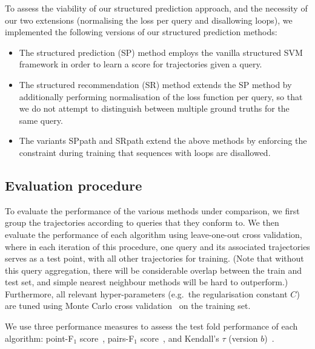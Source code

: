 To assess the viability of our structured prediction approach, and the necessity of our two extensions (normalising the loss per query and disallowing loops), we implemented the following versions of our structured prediction methods:
\begin{itemize}[leftmargin=0.125in]
	\item The structured prediction ({\sc SP}) method employs the vanilla structured SVM framework in order to learn a score for trajectories given a query.

	\item The structured recommendation ({\sc SR}) method extends the {\sc SP} method by additionally performing normalisation of the loss function per query,
	so that we do not attempt to distinguish between multiple ground truths for the same query.

	\item The variants {\sc SPpath} and {\sc SRpath} extend the above methods by enforcing the constraint during training that sequences with loops are disallowed.
\end{itemize}


%
\subsection{Evaluation procedure}

To evaluate the performance of the various methods under comparison,
we first group the trajectories according to queries that they conform to.
We then evaluate the performance of each algorithm using leave-one-out cross validation,
where in each iteration of this procedure,
one query and its associated trajectories serves as a test point, with all other trajectories for training.
(Note that without this query aggregation, there will be considerable overlap between the train and test set, and simple nearest neighbour methods will be hard to outperform.)
Furthermore, 
all relevant hyper-parameters (e.g.\ the regularisation constant $C$) are tuned using Monte Carlo cross validation~\cite{burman1989comparative} on the training set.

We use three performance measures to assess the test fold performance of each algorithm:
point-F$_1$ score~\cite{ijcai15},
pairs-F$_1$ score~\cite{cikm16paper},
and
Kendall's $\tau$ (version $b$)~\cite{kendall1945,agresti2010analysis}.

